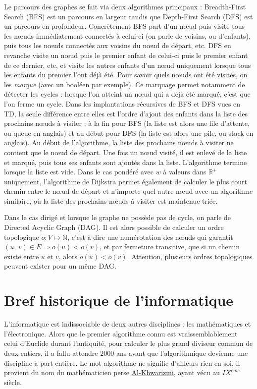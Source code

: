 \documentclass[10pt]{article}
\begin{document}
Le parcours des graphes se fait via deux algorithmes principaux : Breadth-First Search (BFS) est un parcours en largeur tandis que
Depth-First Search (DFS) est un parcours en profondeur. Concrètement BFS part d'un nœud puis visite tous les nœuds immédiatement connectés à celui-ci
(on parle de voisins, ou d'enfants), puis tous les nœuds connectés aux voisins du nœud de départ, etc. DFS en revanche visite un nœud puis le premier
enfant de celui-ci puis le premier enfant de ce dernier, etc, et visite les autres enfants d'un nœud uniquement lorsque tous les enfants du premier
l'ont déjà été. Pour savoir quels nœuds ont été visités, on les \emph{marque} (avec un booléen par exemple).
Ce marquage permet notamment de détecter les cycles : lorsque l'on
atteint un nœud qui a déjà été marqué, c'est que l'on ferme un cycle. Dans les implantations récursives de BFS et DFS vues en TD, la seule différence entre elles est l'ordre
d'ajout des enfants dans la liste des prochains nœuds à visiter : à la fin pour BFS (la liste est alors une file d'attente, ou queue en anglais)
et au début pour DFS (la liste est alors une pile, ou stack en anglais). Au début de l'algorithme, la liste des prochains nœuds à visiter ne contient
que le nœud de départ. Une fois un nœud visité, il est enlevé de la liste et marqué, puis tous ses enfants sont ajoutés dans la liste.
L'algorithme termine lorsque la liste est vide. Dans le cas pondéré avec $w$ à valeurs dans $\mathbb{R}^+$ uniquement,
l'algorithme de Dijkstra permet également de calculer le plus court chemin entre le nœud de départ et n'importe quel autre nœud
avec un algorithme similaire, où la liste des prochains nœuds à visiter est maintenue triée.

Dans le cas dirigé et lorsque le graphe ne possède pas de cycle, on parle de Directed Acyclic Graph (DAG). Il est alors possible de
calculer un ordre topologique $o : V \longmapsto \mathbb{N}$, c'est à dire une numérotation des nœuds qui garantit
$(u,\, v) \in E \Longrightarrow o(u) < o(v)$, et par \href{https://fr.wikipedia.org/wiki/Fermeture_transitive}{fermeture transitive},
que si un chemin existe entre $u$ et $v$, alors $o(u) < o(v)$.
Attention, plusieurs ordres topologiques peuvent exister pour un même DAG.


\section{Bref historique de l'informatique}

L'informatique est indissociable de deux autres disciplines : les mathématiques et l'électronique. Alors que le premier algorithme
connu est vraissemblablement celui d'Euclide durant l'antiquité, pour calculer le plus grand diviseur commun de deux entiers, il a fallu attendre
$2000$ ans avant que l'algorithmique devienne une discipline à part entière. Le mot algorithme ne signifie d'ailleurs rien en soi,
il provient du nom du mathématicien perse \href{https://fr.wikipedia.org/wiki/Al-Khw\%C3\%A2rizm\%C3\%AE}{Al-Khwarizmi}, ayant vécu au $IX^{\mathit{ème}}$ siècle.
\end{document}
